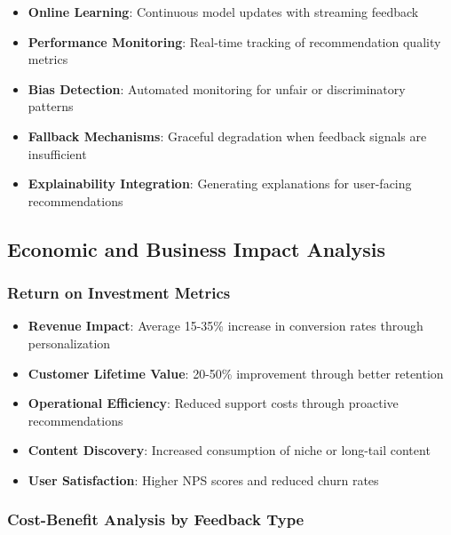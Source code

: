\begin{itemize}
    \item \textbf{Online Learning}: Continuous model updates with streaming feedback
    \item \textbf{Performance Monitoring}: Real-time tracking of recommendation quality metrics
    \item \textbf{Bias Detection}: Automated monitoring for unfair or discriminatory patterns
    \item \textbf{Fallback Mechanisms}: Graceful degradation when feedback signals are insufficient
    \item \textbf{Explainability Integration}: Generating explanations for user-facing recommendations
\end{itemize}

\subsection{Economic and Business Impact Analysis}

\subsubsection{Return on Investment Metrics}

\begin{itemize}
    \item \textbf{Revenue Impact}: Average 15-35\% increase in conversion rates through personalization
    \item \textbf{Customer Lifetime Value}: 20-50\% improvement through better retention
    \item \textbf{Operational Efficiency}: Reduced support costs through proactive recommendations
    \item \textbf{Content Discovery}: Increased consumption of niche or long-tail content
    \item \textbf{User Satisfaction}: Higher NPS scores and reduced churn rates
\end{itemize}

\subsubsection{Cost-Benefit Analysis by Feedback Type}

